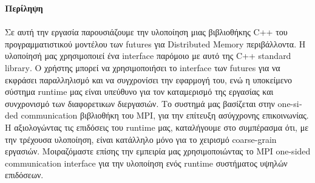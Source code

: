\thispagestyle{empty}


\begin{titlepage}
\begin{center}

{\bf\Large{Περίληψη}}\\

\end{center}

\paragraph{}
Σε αυτή την εργασία παρουσιάζουμε την υλοποίηση μιας βιβλιοθήκης \textlatin{C++} του προγραμματιστικού μοντέλου
των futures για \textlatin{Distributed Memory} περιβάλλοντα. Η υλοποίησή μας χρησιμοποιεί ένα interface παρόμοιο 
με αυτό της \textlatin{C++ standard library}. Ο χρήστης μπορεί να χρησιμοποιήσει το
\textlatin{interface} των \textlatin{futures} για να εκφράσει παραλληλισμό και να συγχρονίσει την εφαρμογή του, ενώ η
υποκείμενο σύστημα \textlatin{runtime} μας είναι υπεύθυνο για τον καταμερισμό της εργασίας και συνχρονισμό των 
διαφορετικων διεργασιών. Το συστημά μας βασίζεται στην \textlatin{one-sided communication} βιβλιοθήκη του \textlatin{MPI},
για την επίτευξη ασύγχρονης επικοινωνίας. Η αξιολογώντας τις επιδόσεις του \textlatin{runtime} μας, καταλήγουμε 
στο συμπέρασμα ότι, με την τρέχουσα υλοποίηση, είναι κατάλληλο μόνο για το χειρισμό \textlatin{coarse-grain} εργασιών.
Μοιραζόμαστε επίσης την εμπειρία μας χρησιμοποιώντας το \textlatin{MPI one-sided communication interface} για την υλοποίηση 
ενός \textlatin{runtime} συστήματος υψηλών επιδόσεων.

\vfill

\end{titlepage}


